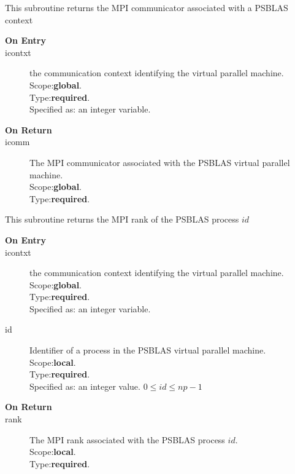 

This subroutine returns the MPI communicator associated with a PSBLAS context
\begin{description}
\item[\bf  On Entry ]
\item[icontxt] the communication context identifying the virtual
  parallel machine.\\
Scope:{\bf global}.\\
Type:{\bf required}.\\
Specified as: an integer variable.
\end{description}

\begin{description}
\item[\bf On Return]
\item[icomm] The MPI communicator associated with the  PSBLAS virtual parallel machine.\\
Scope:{\bf global}.\\
Type:{\bf required}.\\
\end{description}




This subroutine returns the MPI rank of the  PSBLAS process $id$
\begin{description}
\item[\bf  On Entry ]
\item[icontxt] the communication context identifying the virtual
  parallel machine.\\
Scope:{\bf global}.\\
Type:{\bf required}.\\
Specified as: an integer variable.
\item[id] Identifier of a   process in the PSBLAS virtual parallel machine.\\
Scope:{\bf local}.\\
Type:{\bf required}.\\
Specified as: an integer value. $0 \le id \le np-1$\
\end{description}

\begin{description}
\item[\bf On Return]
\item[rank] The MPI rank associated with the  PSBLAS process $id$.\\
Scope:{\bf local}.\\
Type:{\bf required}.\\
\end{description}




